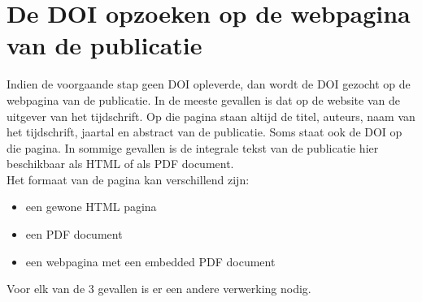 \section{De DOI opzoeken op de webpagina van de publicatie}
Indien de voorgaande stap geen DOI opleverde, dan wordt de DOI gezocht op de webpagina van de publicatie. In de meeste gevallen is dat op de website van de uitgever van het tijdschrift. Op die pagina staan altijd de titel, auteurs, naam van het tijdschrift, jaartal en abstract van de publicatie.
Soms staat ook de DOI op die pagina.
In sommige gevallen is de integrale tekst van de publicatie hier beschikbaar als HTML of als PDF document.\\
Het formaat van de pagina kan verschillend zijn:
\begin{itemize}
    \item een gewone HTML pagina
    \item een PDF document
    \item een webpagina met een embedded PDF document
\end{itemize}
Voor elk van de 3 gevallen is er een andere verwerking nodig.
